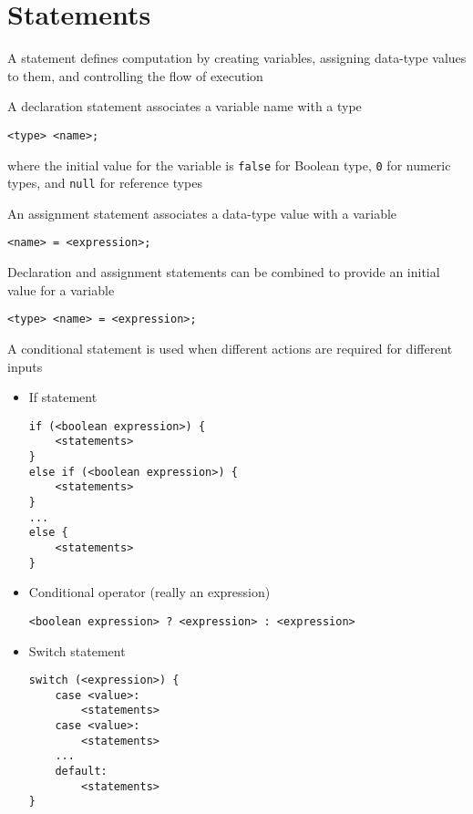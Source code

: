 \documentclass[8pt,a4paper,compress]{beamer}
\begin{document}
\section{Statements}
\begin{frame}[fragile]
A statement defines computation by creating variables, assigning data-type values to them, and controlling the flow of execution

\bigskip

A declaration statement associates a variable name with a type
\begin{lstlisting}[language={}]
<type> <name>;
\end{lstlisting}
where the initial value for the variable is \lstinline{false} for Boolean type, \lstinline{0} for numeric types, and \lstinline{null} for reference types

\bigskip

An assignment statement associates a data-type value with a variable
\begin{lstlisting}[language={}]
<name> = <expression>;
\end{lstlisting}

\bigskip

Declaration and assignment statements can be combined to provide an initial value for a variable
\begin{lstlisting}[language={}]
<type> <name> = <expression>;
\end{lstlisting}
\end{frame}

\begin{frame}[fragile]
A conditional statement is used when different actions are required for different inputs

\begin{itemize}
\item If statement
\begin{lstlisting}[language={}]
if (<boolean expression>) {
    <statements>
}
else if (<boolean expression>) {
    <statements>
}
...
else {
    <statements>
}
\end{lstlisting}

\item Conditional operator (really an expression)
\begin{lstlisting}[language={}]
<boolean expression> ? <expression> : <expression>
\end{lstlisting}

\item Switch statement
\begin{lstlisting}[language={}]
switch (<expression>) {
    case <value>:
        <statements>
    case <value>:
        <statements>
    ...
    default:
        <statements>
}
\end{lstlisting}
\end{itemize}
\end{frame}
\end{document}
